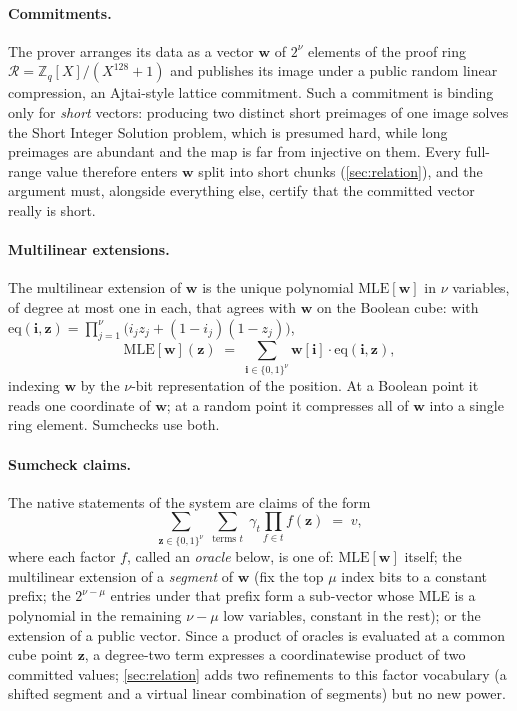 \documentclass[11pt]{article}
\newcommand{\ZZ}{\mathbb{Z}}
\newcommand{\ring}{\mathcal{R}}
\newcommand{\MLE}{\mathrm{MLE}}
\newcommand{\eq}{\mathrm{eq}}
\begin{document}
\paragraph{Commitments.} The prover arranges its data as a vector $\mathbf{w}$ of $2^{\nu}$ elements of the proof ring $\ring = \ZZ_q[X]/(X^{128} + 1)$ and publishes its image under a public random linear compression, an Ajtai-style lattice commitment. Such a commitment is binding only for \emph{short} vectors: producing two distinct short preimages of one image solves the Short Integer Solution problem, which is presumed hard, while long preimages are abundant and the map is far from injective on them. Every full-range value therefore enters $\mathbf{w}$ split into short chunks (\cref{sec:relation}), and the argument must, alongside everything else, certify that the committed vector really is short.

\paragraph{Multilinear extensions.} The multilinear extension of $\mathbf{w}$ is the unique polynomial $\MLE[\mathbf{w}]$ in $\nu$ variables, of degree at most one in each, that agrees with $\mathbf{w}$ on the Boolean cube: with $\eq(\mathbf{i}, \mathbf{z}) = \prod_{j=1}^{\nu} \bigl(i_j z_j + (1 - i_j)(1 - z_j)\bigr)$,
\[
  \MLE[\mathbf{w}](\mathbf{z}) \;=\; \sum_{\mathbf{i} \in \{0,1\}^{\nu}} \mathbf{w}[\mathbf{i}] \cdot \eq(\mathbf{i}, \mathbf{z}),
\]
indexing $\mathbf{w}$ by the $\nu$-bit representation of the position. At a Boolean point it reads one coordinate of $\mathbf{w}$; at a random point it compresses all of $\mathbf{w}$ into a single ring element. Sumchecks use both.

\paragraph{Sumcheck claims.} The native statements of the system are claims of the form
\begin{equation}\label{eq:claim}
  \sum_{\mathbf{z} \in \{0,1\}^{\nu}} \;\sum_{\text{terms } t}\; \gamma_t \prod_{f \in t} f(\mathbf{z}) \;=\; v,
\end{equation}
where each factor $f$, called an \emph{oracle} below, is one of: $\MLE[\mathbf{w}]$ itself; the multilinear extension of a \emph{segment} of $\mathbf{w}$ (fix the top $\mu$ index bits to a constant prefix; the $2^{\nu-\mu}$ entries under that prefix form a sub-vector whose MLE is a polynomial in the remaining $\nu - \mu$ low variables, constant in the rest); or the extension of a public vector. Since a product of oracles is evaluated at a common cube point $\mathbf{z}$, a degree-two term expresses a coordinatewise product of two committed values; \cref{sec:relation} adds two refinements to this factor vocabulary (a shifted segment and a virtual linear combination of segments) but no new power.
\end{document}
